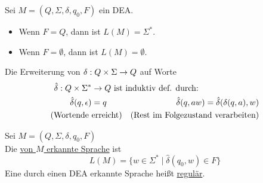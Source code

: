 \begin{Bsp}
    Sei $M=(Q,\Sigma,\delta,q_0,F)$ ein DEA.
    \begin{itemize}
    \item Wenn $F=Q$, dann ist $L(M)=\Sigma^*$.
    \item Wenn $F=\emptyset$, dann ist $L(M)=\emptyset$.
    \end{itemize}
\end{Bsp}
\begin{Def}[name={[Erweiterung von $\delta$ auf Worte]}]
	Die Erweiterung von $\delta:Q\x\Sigma\->Q$ auf Worte
	\begin{align*}
		\hat{\delta}: Q\x\Sigma^*&\->Q\ \rlap{ist induktiv def. durch:}\\
		\hat\delta(q,\epsilon) &=q & \hat\delta(q,aw)=\hat\delta(\delta(q,a),w)\\
		(\text{Wortende\ }&\text{erreicht}) & (\text{Rest im Folgezustand verarbeiten})
	\end{align*}
\end{Def}
\begin{Def}[name={[Die durch einen \acs*{DEA} erkannte Sprache]}]
	Sei $M=(Q,\Sigma,\delta,q_0,F)$\\
	Die \underline{von $M$ erkannte Sprache} ist
	\[ L(M) = \{ w\in\Sigma^* \mid \hat\delta(q_0,w)\in F \} \]
	Eine durch einen \ac{DEA} erkannte Sprache heißt \underline{regulär}.
\end{Def}
